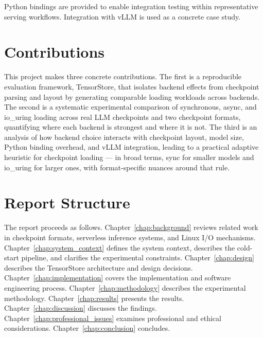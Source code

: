 Python bindings are provided to enable integration testing within representative serving workflows. Integration with vLLM is used as a concrete case study.

\section{Contributions}

This project makes three concrete contributions. The first is a reproducible evaluation framework, TensorStore, that isolates backend effects from checkpoint parsing and layout by generating comparable loading workloads across backends. The second is a systematic experimental comparison of synchronous, async, and io\_uring loading across real LLM checkpoints and two checkpoint formats, quantifying where each backend is strongest and where it is not. The third is an analysis of how backend choice interacts with checkpoint layout, model size, Python binding overhead, and vLLM integration, leading to a practical adaptive heuristic for checkpoint loading --- in broad terms, sync for smaller models and io\_uring for larger ones, with format-specific nuances around that rule.

\section{Report Structure}

The report proceeds as follows. Chapter~\ref{chap:background} reviews related work in checkpoint formats, serverless inference systems, and Linux I/O mechanisms. Chapter~\ref{chap:system_context} defines the system context, describes the cold-start pipeline, and clarifies the experimental constraints. Chapter~\ref{chap:design} describes the TensorStore architecture and design decisions. Chapter~\ref{chap:implementation} covers the implementation and software engineering process. Chapter~\ref{chap:methodology} describes the experimental methodology. Chapter~\ref{chap:results} presents the results. Chapter~\ref{chap:discussion} discusses the findings. Chapter~\ref{chap:professional_issues} examines professional and ethical considerations. Chapter~\ref{chap:conclusion} concludes.
